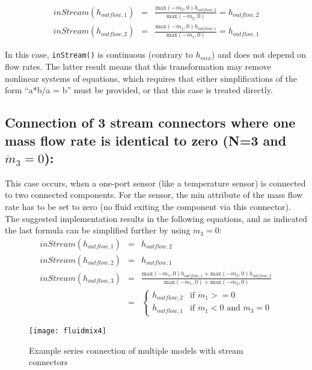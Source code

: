 \begin{eqnarray*}
inStream(h_{outflow,1})&=&\frac{\text{max}(-\dot{m}_2,0)h_{outflow,2}}{\text{max}(-\dot{m}_2,0)}=h_{outflow,2}\\
inStream(h_{outflow,2})&=&\frac{\text{max}(-\dot{m}_1,0)h_{outflow,1}}{\text{max}(-\dot{m}_1,0)}=h_{outflow,1}
\end{eqnarray*}

In this case, \lstinline!inStream()! is continuous (contrary to $h_{mix}$) and does not
depend on flow rates. The latter result means that this transformation
may remove nonlinear systems of equations, which requires that either
simplifications of the form ``a*b/a = b'' must be provided, or that this
case is treated directly.

\subsection{Connection of 3 stream connectors where one mass flow rate is identical to zero (N=3 and $\dot{m}_3=0$):}
This case occurs, when a one-port sensor (like a temperature sensor) is
connected to two connected components. For the sensor, the min attribute
of the mass flow rate has to be set to zero (no fluid exiting the
component via this connector). The suggested implementation results in
the following equations, and as indicated the last formula can be
simplified further by using $\dot{m}_3=0$:
\begin{eqnarray*}
inStream(h_{outflow,1})&=&h_{outflow,2}\\
inStream(h_{outflow,2})&=&h_{outflow,1}\\
inStream(h_{outflow,3})&=&\frac{\text{max}(-\dot{m}_1,0)h_{outflow,1}+\text{max}(-\dot{m}_2,0)h_{outflow,2}}{\text{max}(-\dot{m}_1,0)+\text{max}(-\dot{m}_2,0)}\\
&=&\begin{cases}
h_{outflow,2}&\text{if $\dot{m}_1>=0$}\\
h_{outflow,1}&\text{if $\dot{m}_1<0$ and $\dot{m}_3=0$}
\end{cases}
\end{eqnarray*}
\begin{figure}[H]
\caption{Example series connection of multiple models with stream connectors }
\begin{center}
\texttt{[image: fluidmix4]}
\end{center}
\end{figure}

